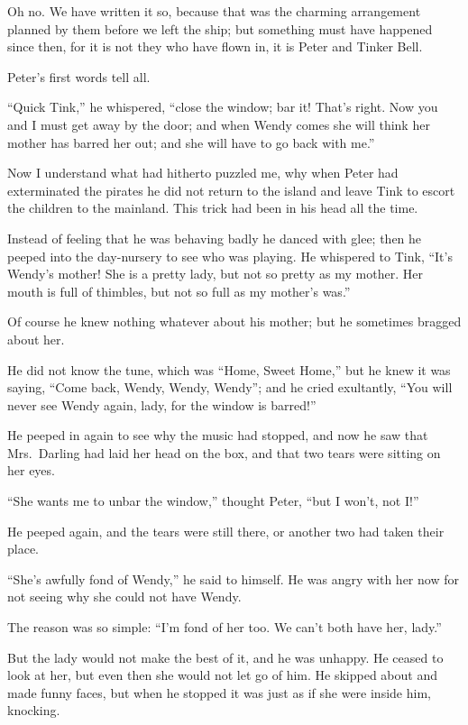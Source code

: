 Oh no. We have written it so, because that was the charming arrangement
planned by them before we left the ship; but something must have
happened since then, for it is not they who have flown in, it is Peter
and Tinker Bell.

Peter's first words tell all.

``Quick Tink,'' he whispered, ``close the window; bar it! That's right.
Now you and I must get away by the door; and when Wendy comes she will
think her mother has barred her out; and she will have to go back with
me.''

Now I understand what had hitherto puzzled me, why when Peter had
exterminated the pirates he did not return to the island and leave Tink
to escort the children to the mainland. This trick had been in his head
all the time.

Instead of feeling that he was behaving badly he danced with glee; then
he peeped into the day-nursery to see who was playing. He whispered to
Tink, ``It's Wendy's mother! She is a pretty lady, but not so pretty as
my mother. Her mouth is full of thimbles, but not so full as my
mother's was.''

Of course he knew nothing whatever about his mother; but he sometimes
bragged about her.

He did not know the tune, which was ``Home, Sweet Home,'' but he knew it
was saying, ``Come back, Wendy, Wendy, Wendy''; and he cried exultantly,
``You will never see Wendy again, lady, for the window is barred!''

He peeped in again to see why the music had stopped, and now he saw
that Mrs.\ Darling had laid her head on the box, and that two tears were
sitting on her eyes.

``She wants me to unbar the window,'' thought Peter, ``but I won't, not
I!''

He peeped again, and the tears were still there, or another two had
taken their place.

``She's awfully fond of Wendy,'' he said to himself. He was angry with
her now for not seeing why she could not have Wendy.

The reason was so simple: ``I'm fond of her too. We can't both have her,
lady.''

But the lady would not make the best of it, and he was unhappy. He
ceased to look at her, but even then she would not let go of him. He
skipped about and made funny faces, but when he stopped it was just as
if she were inside him, knocking.

